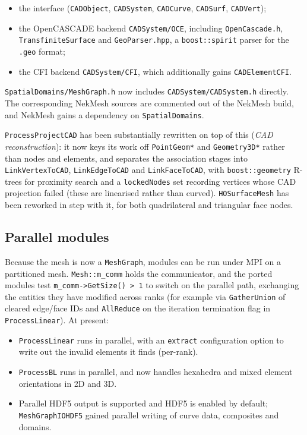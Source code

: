 \begin{itemize}
  \item the interface (\texttt{CADObject}, \texttt{CADSystem},
    \texttt{CADCurve}, \texttt{CADSurf}, \texttt{CADVert});
  \item the OpenCASCADE backend \texttt{CADSystem/OCE}, including
    \texttt{OpenCascade.h}, \texttt{TransfiniteSurface} and
    \texttt{GeoParser.hpp}, a \texttt{boost::spirit} parser for the
    \texttt{.geo} format;
  \item the CFI backend \texttt{CADSystem/CFI}, which additionally
    gains \texttt{CADElementCFI}.
\end{itemize}

\noindent \texttt{SpatialDomains/MeshGraph.h} now includes
\texttt{CADSystem/CADSystem.h} directly. The corresponding NekMesh
sources are commented out of the NekMesh build, and NekMesh gains a
dependency on \texttt{SpatialDomains}.

\texttt{ProcessProjectCAD} has been substantially rewritten on top of
this (\textit{CAD reconstruction}): it now keys its work off
\texttt{PointGeom*} and \texttt{Geometry3D*} rather than nodes and
elements, and separates the association stages into
\texttt{LinkVertexToCAD}, \texttt{LinkEdgeToCAD} and
\texttt{LinkFaceToCAD}, with \texttt{boost::geometry} R-trees for
proximity search and a \texttt{lockedNodes} set recording vertices
whose CAD projection failed (these are linearised rather than curved).
\texttt{HOSurfaceMesh} has been reworked in step with it, for both
quadrilateral and triangular face nodes.

\subsection{Parallel modules}
Because the mesh is now a \texttt{MeshGraph}, modules can be run under
MPI on a partitioned mesh. \texttt{Mesh::m\_comm} holds the
communicator, and the ported modules test
\texttt{m\_comm->GetSize() > 1} to switch on the parallel path,
exchanging the entities they have modified across ranks (for example
via \texttt{GatherUnion} of cleared edge/face IDs and
\texttt{AllReduce} on the iteration termination flag in
\texttt{ProcessLinear}). At present:

\begin{itemize}
  \item \texttt{ProcessLinear} runs in parallel, with an
    \texttt{extract} configuration option to write out the invalid
    elements it finds (per-rank).
  \item \texttt{ProcessBL} runs in parallel, and now handles
    hexahedra and mixed element orientations in 2D and 3D.
  \item Parallel HDF5 output is supported and HDF5 is enabled by
    default; \texttt{MeshGraphIOHDF5} gained parallel writing of
    curve data, composites and domains.
\end{itemize}

